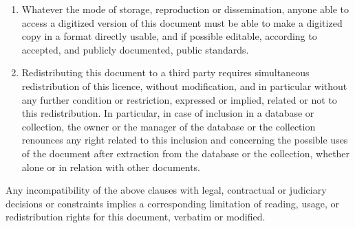 \begin{enumerate}
\item Whatever the mode of storage, reproduction or dissemination, anyone able 
to access a digitized version of this document must be able to make a 
digitized copy in a format directly usable, and if possible editable, 
according to accepted, and publicly documented, public standards.

\item Redistributing this document to a third party requires simultaneous 
redistribution of this licence, without modification, and in particular 
without any further condition or restriction, expressed or implied, related 
or not to this redistribution. In particular, in case of inclusion in a 
database or collection, the owner or the manager of the database or the 
collection renounces any right related to this inclusion and concerning the 
possible uses of the document after extraction from the database or the 
collection, whether alone or in relation with other documents.

\end{enumerate}

Any incompatibility of the above clauses with legal, contractual or 
judiciary decisions or constraints implies a corresponding limitation 
of reading, usage, or redistribution rights for this document, 
verbatim or modified.
